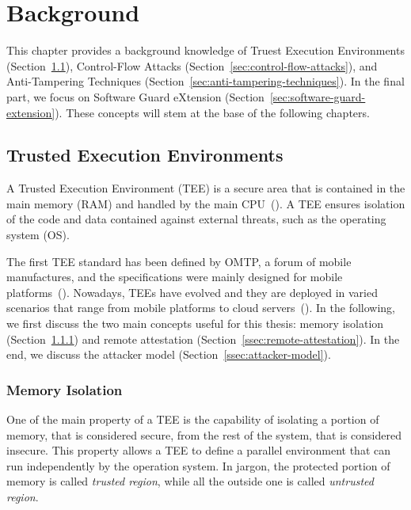 \chapter{Background}
\label{chp:background} 

This chapter provides a background knowledge of Truest Execution Environments 
(Section~\ref{sec:trusted-execution-enviroments}), Control-Flow Attacks 
(Section~\ref{sec:control-flow-attacks}), and Anti-Tampering Techniques 
(Section~\ref{sec:anti-tampering-techniques}).
In the final part, we focus on Software Guard eXtension 
(Section~\ref{sec:software-guard-extension}).
These concepts will stem at the base of the following chapters.

\section{Trusted Execution Environments}
\label{sec:trusted-execution-enviroments}

A Trusted Execution Environment (TEE) is a secure area that is contained in the 
main memory (RAM) and handled by the main CPU~(\cite{Sabt2015TrustedEE}).
A TEE ensures isolation of the code and data contained against external 
threats, such as the operating system (OS).

The first TEE standard has been defined by OMTP, a forum of mobile 
manufactures, and the specifications were mainly designed for mobile 
platforms~(\cite{omtp}).
Nowadays, TEEs have evolved and they are deployed in varied scenarios that 
range from mobile platforms to cloud servers~(\cite{schuster2015vc3,sgxtor}).
In the following, we first discuss the two main concepts useful for this 
thesis: memory isolation (Section~\ref{ssec:memory-isolation}) and remote 
attestation (Section~\ref{ssec:remote-attestation}).
In the end, we discuss the attacker model (Section~\ref{ssec:attacker-model}).

\subsection{Memory Isolation}
\label{ssec:memory-isolation}

One of the main property of a TEE is the capability of isolating a portion of 
memory, that is considered secure, from the rest of the system, that  is 
considered insecure.
This property allows a TEE to define a parallel environment that can run 
independently by the operation system.
In jargon, the protected portion of memory is called \emph{trusted 
region}, while all the outside one is called \emph{untrusted region}.

